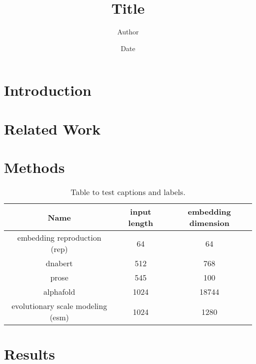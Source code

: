\documentclass[12pt, letterpaper, twocolumn]{article}
\title{Title}
\author{Author}
\date{Date}
\begin{document}
\maketitle

\section{Introduction}

\section{Related Work}

\section{Methods}


\onecolumn
\begin{table}[h]
\centering
\begin{tabular}{|c c c|} 
    \hline
    Name & input length & embedding dimension  \\ 
    \hline
    embedding reproduction (rep)        & 64    & 64    \\
    dnabert                             & 512     & 768  \\
    prose                               & 545   & 100    \\
    alphafold                           & 1024   & 18744 \\
    evolutionary scale modeling (esm)   & 1024    & 1280 \\  
    \hline
\end{tabular}
\caption{Table to test captions and labels.}
\label{table:data}
\end{table}
\twocolumn

\section{Results}
\end{document}
